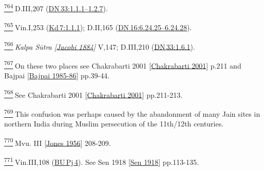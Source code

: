 \label{footprints_split_025.html_fn764}
\hyperref[footprints_split_019.htmlux5cux23fnref764]{\textsuperscript{764}} D.III,207
(\href{https://suttacentral.net/dn33/en/sujato\#1.1.1}{DN\,33:1.1.1--1.2.7}).

\label{footprints_split_025.html_fn765}
\hyperref[footprints_split_019.htmlux5cux23fnref765]{\textsuperscript{765}} Vin.I,253
(\href{https://suttacentral.net/pli-tv-kd7/en/brahmali\#1.1.1}{Kd\,7:1.1.1});
D.II,165
(\href{https://suttacentral.net/dn16/en/sujato\#6.24.25}{DN\,16:6.24.25--6.24.28}).

\label{footprints_split_025.html_fn766}
\hyperref[footprints_split_019.htmlux5cux23fnref766]{\textsuperscript{766}} \emph{{Kalpa
Sūtra
{{[}\hyperref[footprints_split_022.htmlux5cux23Jacobiux5cux25201884]{Jacobi
1884}{]}}}} V,147; D.III,210
(\href{https://suttacentral.net/dn33/en/sujato\#1.6.1}{DN\,33:1.6.1}).

\label{footprints_split_025.html_fn767}
\hyperref[footprints_split_019.htmlux5cux23fnref767]{\textsuperscript{767}} On
these two places see {Chakrabarti 2001
{{[}\hyperref[footprints_split_022.htmlux5cux23Chakrabartiux5cux25202001]{Chakrabarti
2001}{]}}} p.211 and {Bajpai
{{[}\hyperref[footprints_split_022.htmlux5cux23Bajpaiux5cux25201985-86]{Bajpai
1985-86}{]}}} pp.39-44.

\label{footprints_split_025.html_fn768}
\hyperref[footprints_split_019.htmlux5cux23fnref768]{\textsuperscript{768}} See
{Chakrabarti 2001
{{[}\hyperref[footprints_split_022.htmlux5cux23Chakrabartiux5cux25202001]{Chakrabarti
2001}{]}}} pp.211-213.

\label{footprints_split_025.html_fn769}
\hyperref[footprints_split_019.htmlux5cux23fnref769]{\textsuperscript{769}} This
confusion was perhaps caused by the abandonment of many Jain sites in
northern India during Muslim persecution of the 11{th}/12{th} centuries.

\label{footprints_split_025.html_fn770}
\hyperref[footprints_split_019.htmlux5cux23fnref770]{\textsuperscript{770}} {Mvu.
III
{{[}\hyperref[footprints_split_023.htmlux5cux23Jonesux5cux25201956]{Jones
1956}{]}}} 208-209.

\label{footprints_split_025.html_fn771}
\hyperref[footprints_split_019.htmlux5cux23fnref771]{\textsuperscript{771}} Vin.III,108
(\href{https://suttacentral.net/pli-tv-bu-vb-pj4/en/brahmali\#9.4.1}{BU\,Pj\,4}).
See {Sen 1918
{{[}\hyperref[footprints_split_022.htmlux5cux23Senux5cux25201918]{Sen
1918}{]}}} pp.113-135.


